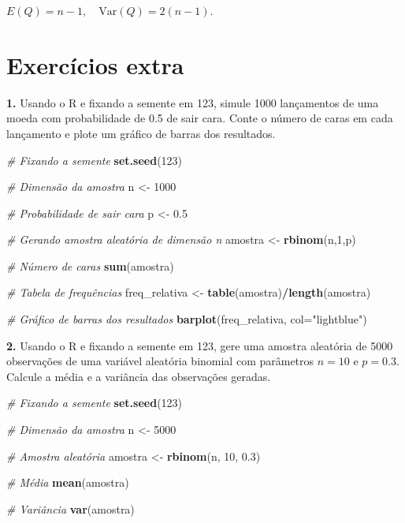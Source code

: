 \documentclass[
]{book}
\newenvironment{Shaded}{\begin{snugshade}}{\end{snugshade}}
\newcommand{\AttributeTok}[1]{\textcolor[rgb]{0.13,0.29,0.53}{#1}}
\newcommand{\CommentTok}[1]{\textcolor[rgb]{0.56,0.35,0.01}{\textit{#1}}}
\newcommand{\DecValTok}[1]{\textcolor[rgb]{0.00,0.00,0.81}{#1}}
\newcommand{\FloatTok}[1]{\textcolor[rgb]{0.00,0.00,0.81}{#1}}
\newcommand{\FunctionTok}[1]{\textcolor[rgb]{0.13,0.29,0.53}{\textbf{#1}}}
\newcommand{\NormalTok}[1]{#1}
\newcommand{\OtherTok}[1]{\textcolor[rgb]{0.56,0.35,0.01}{#1}}
\newcommand{\SpecialCharTok}[1]{\textcolor[rgb]{0.81,0.36,0.00}{\textbf{#1}}}
\newcommand{\StringTok}[1]{\textcolor[rgb]{0.31,0.60,0.02}{#1}}
\begin{document}
\(E(Q) = n - 1, \quad \text{Var}(Q) = 2(n - 1)\).

\chapter{Exercícios extra}\label{exercuxedcios-extra}

\textbf{1.} Usando o R e fixando a semente em 123, simule 1000 lançamentos de
uma moeda com probabilidade de 0.5 de sair cara. Conte o número de caras
em cada lançamento e plote um gráfico de barras dos resultados.

\begin{Shaded}
\begin{Highlighting}[]
\CommentTok{\# Fixando a semente}
\FunctionTok{set.seed}\NormalTok{(}\DecValTok{123}\NormalTok{)}

\CommentTok{\# Dimensão da amostra}
\NormalTok{n }\OtherTok{\textless{}{-}} \DecValTok{1000}

\CommentTok{\# Probabilidade de sair cara}
\NormalTok{p }\OtherTok{\textless{}{-}} \FloatTok{0.5}

\CommentTok{\# Gerando amostra aleatória de dimensão n}
\NormalTok{amostra }\OtherTok{\textless{}{-}} \FunctionTok{rbinom}\NormalTok{(n,}\DecValTok{1}\NormalTok{,p)}

\CommentTok{\# Número de caras}
\FunctionTok{sum}\NormalTok{(amostra)}

\CommentTok{\# Tabela de frequências}
\NormalTok{freq\_relativa }\OtherTok{\textless{}{-}} \FunctionTok{table}\NormalTok{(amostra)}\SpecialCharTok{/}\FunctionTok{length}\NormalTok{(amostra)}

\CommentTok{\# Gráfico de barras dos resultados}
\FunctionTok{barplot}\NormalTok{(freq\_relativa, }\AttributeTok{col=}\StringTok{"lightblue"}\NormalTok{)}
\end{Highlighting}
\end{Shaded}

\textbf{2.} Usando o R e fixando a semente em 123, gere uma amostra aleatória
de 5000 observações de uma variável aleatória binomial com parâmetros
\(n = 10\) e \(p = 0.3\). Calcule a média e a variância das observações
geradas.

\begin{Shaded}
\begin{Highlighting}[]
\CommentTok{\# Fixando a semente}
\FunctionTok{set.seed}\NormalTok{(}\DecValTok{123}\NormalTok{)}

\CommentTok{\# Dimensão da amostra}
\NormalTok{n }\OtherTok{\textless{}{-}} \DecValTok{5000}

\CommentTok{\# Amostra aleatória}
\NormalTok{amostra }\OtherTok{\textless{}{-}} \FunctionTok{rbinom}\NormalTok{(n, }\DecValTok{10}\NormalTok{, }\FloatTok{0.3}\NormalTok{)}

\CommentTok{\# Média}
\FunctionTok{mean}\NormalTok{(amostra)}

\CommentTok{\# Variância}
\FunctionTok{var}\NormalTok{(amostra)}
\end{Highlighting}
\end{Shaded}
\end{document}
